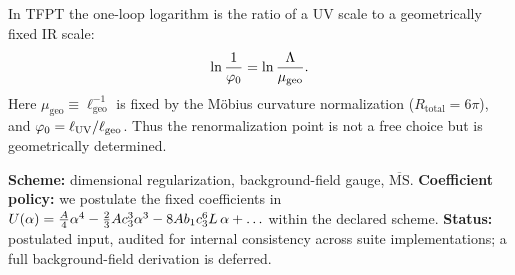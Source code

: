 \begin{tcolorbox}[colback=gray!5, colframe=gray!60,
    title={\textbf{Lemma (Geometric Fixing of the Log)}}, fonttitle=\bfseries\small]
In TFPT the one-loop logarithm is the ratio of a UV scale to a geometrically fixed IR scale:
\begin{equation}
    \ln\frac{1}{\varphi_0} = \ln\frac{\Lambda}{\mu_{\text{geo}}}.
\end{equation}
Here $\mu_{\text{geo}} \equiv \ell_{\text{geo}}^{-1}$ is fixed by the M\"obius curvature
normalization ($R_{\text{total}}=6\pi$), and $\varphi_0 = \ell_{\text{UV}}/\ell_{\text{geo}}$.
Thus the renormalization point is not a free choice but is geometrically determined.
\end{tcolorbox}

\begin{tcolorbox}[colback=yellow!3, colframe=yellow!60!black,
    title={\textbf{Quantization and scheme declaration}}, fonttitle=\bfseries\small]
\textbf{Scheme:} dimensional regularization, background-field gauge, $\overline{\mathrm{MS}}$.
\textbf{Coefficient policy:} we postulate the fixed coefficients in
$U(\alpha)=\frac{A}{4}\alpha^4-\frac{2}{3}Ac_3^3\alpha^3-8Ab_1c_3^6 L\,\alpha+\ldots$
within the declared scheme.
\textbf{Status:} postulated input, audited for internal consistency across suite implementations;
a full background-field derivation is deferred.
\end{tcolorbox}

